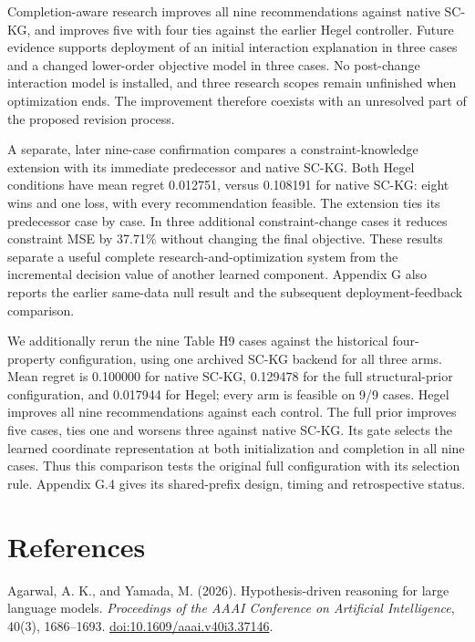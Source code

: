 \documentclass[11pt,a4paper]{article}
\begin{document}
Completion-aware research improves all nine recommendations against native
SC-KG, and improves five with four ties against the earlier Hegel controller.
Future evidence supports deployment of an initial interaction explanation in
three cases and a changed lower-order objective model in three cases. No
post-change interaction model is installed, and three research scopes remain
unfinished when optimization ends. The improvement therefore coexists with an
unresolved part of the proposed revision process.


A separate, later nine-case confirmation compares a constraint-knowledge
extension with its immediate predecessor and native SC-KG. Both Hegel conditions
have mean regret 0.012751, versus 0.108191 for native SC-KG: eight wins and one
loss, with every recommendation feasible. The extension ties its predecessor
case by case. In three additional constraint-change cases it reduces constraint
MSE by 37.71\% without changing the final objective. These results separate a
useful complete research-and-optimization system from the incremental decision
value of another learned component. Appendix G also reports the earlier
same-data null result and the subsequent deployment-feedback comparison.


We additionally rerun the nine Table H9 cases against the historical four-property
configuration, using one archived SC-KG backend for all three arms. Mean regret
is 0.100000 for native SC-KG, 0.129478 for the full structural-prior configuration,
and 0.017944 for Hegel; every arm is feasible on 9/9 cases. Hegel improves all nine
recommendations against each control. The full prior improves five cases, ties
one and worsens three against native SC-KG. Its gate selects the learned
coordinate representation at both initialization and completion in all nine
cases. Thus this comparison tests the original full configuration with its
selection rule. Appendix G.4 gives its shared-prefix design, timing and
retrospective status.


\clearpage

\section*{References}

\begingroup\small\raggedright

Agarwal, A. K., and Yamada, M. (2026). Hypothesis-driven reasoning for large language models. \emph{Proceedings of the AAAI Conference on Artificial Intelligence}, 40(3), 1686–1693. \href{https://doi.org/10.1609/aaai.v40i3.37146}{doi:10.1609/aaai.v40i3.37146}.
\end{document}
